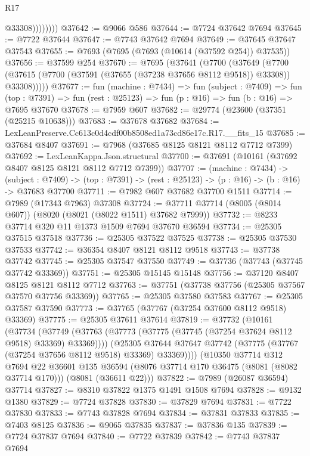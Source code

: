 \begin{lexlean}{R17}
\begin{coremodule}
                    @33308))))))))
@37642 := @9066 @586
@37644 := @7724 @37642 @7694
@37645 := @7722 @37644
@37647 := @7743 @37642 @7694
@37649 := @37645 @37647 @37543
@37655 := @7693 (@7695 (@7693 (@10614 (@37592 @254)) @37535))
@37656 := @37599 @254
@37670 := @7695
    (@37641
      (@7700
        (@37649
          (@7700 (@37615 (@7700 (@37591 (@37655 (@37238 @37656 @8112 @9518)) @33308)) @33308)))))
@37677 := fun (machine : @7434) =>
  fun (subject : @7409) =>
  fun (top : @7391) => fun (rest : @25123) => fun (p : @16) => fun (b : @16) => @7695 @37670
@37678 := @7959 @607
@37682 := @29774 (@23600 (@37351 (@25215 @10638)))
@37683 := @37678 @37682
@37684 := LexLeanPreserve.Cc613c0d4cdf00b8508ed1a73cd86e17c.R17.__fits_15
@37685 := @37684 @8407
@37691 := @7968 (@37685 @8125 @8121 @8112 @7712 @7399)
@37692 := LexLeanKappa.Json.structural
@37700 := @37691 (@10161 (@37692 @8407 @8125 @8121 @8112 @7712 @7399))
@37707 := (machine : @7434) ->
  (subject : @7409) -> (top : @7391) -> (rest : @25123) -> (p : @16) -> (b : @16) -> @37683 @37700
@37711 := @7982 @607 @37682 @37700 @1511
@37714 := @7989 (@17343 @7963) @37308
@37724 := @37711 @37714 (@8005 (@8014 @607)) (@8020 (@8021 (@8022 @1511) @37682 @7999))
@37732 := @8233 @37714 @320 @11 @1373 @1509 @7694 @37670 @36594
@37734 := @25305 @37515 @37518
@37736 := @25305 @37522 @37525
@37738 := @25305 @37530 @37533
@37742 := @36354 @8407 @8121 @8112 @9518
@37743 := @37738 @37742
@37745 := @25305 @37547 @37550
@37749 := @37736 (@37743 (@37745 @37742 @33369))
@37751 := @25305 @15145 @15148
@37756 := @37120 @8407 @8125 @8121 @8112 @7712
@37763 := @37751 (@37738 @37756 (@25305 @37567 @37570 @37756 @33369))
@37765 := @25305 @37580 @37583
@37767 := @25305 @37587 @37590
@37773 := @37765 (@37767 (@37254 @37600 @8112 @9518) @33369)
@37775 := @25305 @37611 @37614
@37819 := @37732
    (@10161
      (@37734
        (@37749 (@37763 (@37773 (@37775 (@37745 (@37254 @37624 @8112 @9518) @33369) @33369))))
        (@25305 @37644 @37647 @37742 (@37775 (@37767 (@37254 @37656 @8112 @9518) @33369) @33369))))
    (@10350
      @37714
      @312
      @7694
      @22
      @36601
      @135
      @36594
      (@8076 @37714 @170 @36475 (@8081 (@8082 @37714 @170)))
      (@8081 (@36611 @22)))
@37822 := @7989 (@26087 @36594) @37714
@37827 := @8310 @37822 @1375 @1491 @1508 @7694
@37828 := @9132 @1380
@37829 := @7724 @37828
@37830 := @37829 @7694
@37831 := @7722 @37830
@37833 := @7743 @37828 @7694
@37834 := @37831 @37833
@37835 := @7403 @8125
@37836 := @9065 @37835
@37837 := @37836 @135
@37839 := @7724 @37837 @7694
@37840 := @7722 @37839
@37842 := @7743 @37837 @7694

\end{coremodule}
\end{lexlean}

